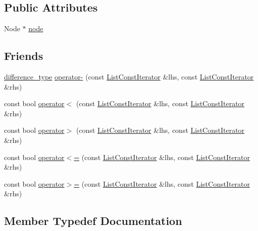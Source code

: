 \subsection*{Public Attributes}
\begin{DoxyCompactItemize}
\item 
Node $\ast$ \hyperlink{structprism_1_1_list_const_iterator_a373ff5f84e74e50e52ff94162207d68e}{node}
\end{DoxyCompactItemize}
\subsection*{Friends}
\begin{DoxyCompactItemize}
\item 
\hyperlink{structprism_1_1_list_const_iterator_a16d9c896e7353dc34db8cd8e0edbf40d}{difference\+\_\+type} \hyperlink{structprism_1_1_list_const_iterator_af2aaffc284b1e7cfc6cd27ca7f6a04cb}{operator-\/} (const \hyperlink{structprism_1_1_list_const_iterator}{List\+Const\+Iterator} \&lhs, const \hyperlink{structprism_1_1_list_const_iterator}{List\+Const\+Iterator} \&rhs)
\item 
const bool \hyperlink{structprism_1_1_list_const_iterator_a06e7f8ea77c503503dca203a503a7c6d}{operator$<$} (const \hyperlink{structprism_1_1_list_const_iterator}{List\+Const\+Iterator} \&lhs, const \hyperlink{structprism_1_1_list_const_iterator}{List\+Const\+Iterator} \&rhs)
\item 
const bool \hyperlink{structprism_1_1_list_const_iterator_a3743f555c1c2f03a44ac2833f7ecaf54}{operator$>$} (const \hyperlink{structprism_1_1_list_const_iterator}{List\+Const\+Iterator} \&lhs, const \hyperlink{structprism_1_1_list_const_iterator}{List\+Const\+Iterator} \&rhs)
\item 
const bool \hyperlink{structprism_1_1_list_const_iterator_a853099a440737dfdd77b683e5f5e27bd}{operator$<$=} (const \hyperlink{structprism_1_1_list_const_iterator}{List\+Const\+Iterator} \&lhs, const \hyperlink{structprism_1_1_list_const_iterator}{List\+Const\+Iterator} \&rhs)
\item 
const bool \hyperlink{structprism_1_1_list_const_iterator_ad7f9f76ffafeb4f4893edd8ff4e6ddcf}{operator$>$=} (const \hyperlink{structprism_1_1_list_const_iterator}{List\+Const\+Iterator} \&lhs, const \hyperlink{structprism_1_1_list_const_iterator}{List\+Const\+Iterator} \&rhs)
\end{DoxyCompactItemize}


\subsection{Member Typedef Documentation}
